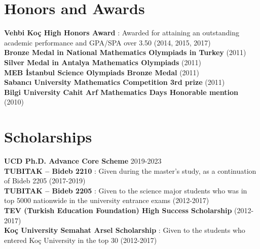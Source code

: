 \documentclass[letterpaper,11pt]{article}
\makeatletter
\newcommand{\resumeSubheading}[4]{
  \vspace{-2pt}\item
    \begin{tabular*}{1.0\textwidth}[t]{l@{\extracolsep{\fill}}r}
      \textbf{#1} & \textbf{\small #2} \\
      \textit{\small#3} & \textit{\small #4} \\
    \end{tabular*}\vspace{-7pt}
}
\newcommand{\resumeSubHeadingListStart}{\begin{itemize}[leftmargin=0.0in, label={}]}
\newcommand{\resumeSubHeadingListEnd}{\end{itemize}}
\makeatother
\begin{document}
\section{Honors and Awards}
\textbf{Vehbi Koç High Honors Award} {: Awarded for attaining an outstanding academic performance and GPA/SPA over 3.50 (2014, 2015, 2017)}\\
\textbf{Bronze Medal in National Mathematics Olympiads in Turkey} {(2011)}\\
\textbf{Silver Medal in Antalya Mathematics Olympiads} {(2011)}\\
\textbf{MEB İstanbul Science Olympiads Bronze Medal} {(2011)}\\
\textbf{Sabancı University Mathematics Competition 3rd prize} {(2011)}\\
\textbf{Bilgi University Cahit Arf Mathematics Days Honorable mention} {(2010)}


\section{Scholarships}
\textbf{UCD Ph.D. Advance Core Scheme} {2019-2023} \\
\textbf{TUBITAK – Bideb 2210} {: Given during the master’s study, as a continuation of Bideb 2205 (2017-2019)}\\
\textbf{TUBITAK – Bideb 2205} {: Given to the science major students who was in top 5000 nationwide in the university entrance exams (2012-2017)}\\
\textbf{TEV (Turkish Education Foundation) High Success Scholarship} {(2012-2017)}\\
\textbf{Koç University Semahat Arsel Scholarship} {: Given to the students who entered Koç University in the top 30 (2012-2017)}

\end{document}
